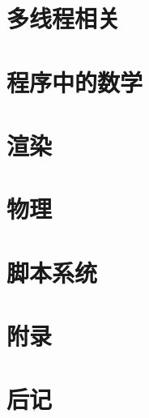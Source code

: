 \documentclass[
    UTF8,       %
    b5paper,    %
    10pt,       %
    oneside,    %
    openright,  %
    titlepage,  %
    final       %
]{ctexbook}
\begin{document}
    \chapter{多线程相关}

    \maketitle
    \chapter{程序中的数学}

    \maketitle
    \chapter{渲染}

    \maketitle
    \chapter{物理}

    \maketitle
    \chapter{脚本系统}

    \appendix
    \maketitle
    \chapter{附录}


    \backmatter
    \chapter{后记}

\end{document}
